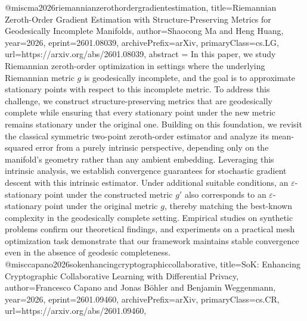 {}@misc{ma2026riemannianzerothordergradientestimation,
      title={Riemannian Zeroth-Order Gradient Estimation with Structure-Preserving Metrics for Geodesically Incomplete Manifolds}, 
      author={Shaocong Ma and Heng Huang},
      year={2026},
      eprint={2601.08039},
      archivePrefix={arXiv},
      primaryClass={cs.LG},
      url={https://arxiv.org/abs/2601.08039},
      abstract = {In this paper, we study Riemannian zeroth-order optimization in settings where the underlying Riemannian metric $g$ is geodesically incomplete, and the goal is to approximate stationary points with respect to this incomplete metric. To address this challenge, we construct structure-preserving metrics that are geodesically complete while ensuring that every stationary point under the new metric remains stationary under the original one. Building on this foundation, we revisit the classical symmetric two-point zeroth-order estimator and analyze its mean-squared error from a purely intrinsic perspective, depending only on the manifold's geometry rather than any ambient embedding. Leveraging this intrinsic analysis, we establish convergence guarantees for stochastic gradient descent with this intrinsic estimator. Under additional suitable conditions, an $ε$-stationary point under the constructed metric $g'$ also corresponds to an $ε$-stationary point under the original metric $g$, thereby matching the best-known complexity in the geodesically complete setting. Empirical studies on synthetic problems confirm our theoretical findings, and experiments on a practical mesh optimization task demonstrate that our framework maintains stable convergence even in the absence of geodesic completeness.}
}@misc{capano2026sokenhancingcryptographiccollaborative,
      title={SoK: Enhancing Cryptographic Collaborative Learning with Differential Privacy}, 
      author={Francesco Capano and Jonas Böhler and Benjamin Weggenmann},
      year={2026},
      eprint={2601.09460},
      archivePrefix={arXiv},
      primaryClass={cs.CR},
      url={https://arxiv.org/abs/2601.09460},
}
